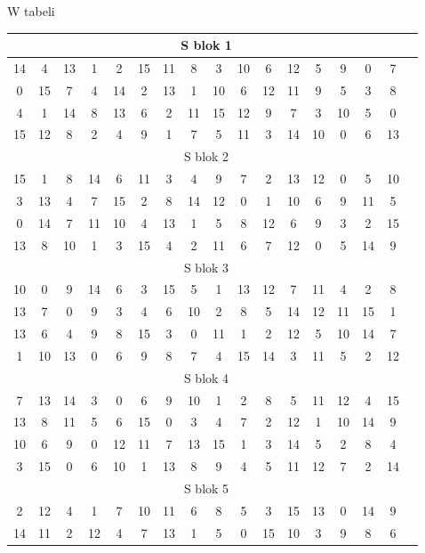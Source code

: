 \documentclass[12p]{article}
\begin{document}
W tabeli
\begin{table}[!h]
\centering
\begin{tabular}{|c|c|c|c|c|c|c|c|c|c|c|c|c|c|c|c|c|}
\hline
\multicolumn{16}{|c|}{S blok 1}\\ 
\hline
14&4&13&1&2&15&11&8&3&10&6&12&5&9&0&7 \\ \hline
0 &	15& 	7 &	4 &	14 &	2& 	13& 	1 &	10 &	6 &	12 &	11 &	9 &	5 &	3 &	8 \\ \hline
4 &	1 &	14 &	8 	&13 	&6 &	2& 	11& 	15& 	12 &	9 	&7& 	3& 	10& 	5& 	0 \\ \hline
15 &	12& 	8 &	2 &	4 &	9 &	1 &	7 &	5 &	11 &	3 &	14 &	10 &	0 &	6 &	13 \\ \hline
\multicolumn{16}{|c|}{S blok 2} \\ \hline
15 &	1 &	8 &	14 &	6 &	11 &	3 &	4 &	9 &	7 &	2 &	13 &	12 &	0 &	5 &	10 \\ \hline
3 &	13& 	4 &	7 &	15 &	2 &	8 &	14 &	12 &	0 &	1 &	10 &	6 &	9 &	11 &	5 \\ \hline
0 &	14 &	7 &	11 &	10 &	4 &	13 &	1 &	5 &	8 &	12 &	6 &	9 &	3 &	2 &	15 \\ \hline
13 &	8 &	10 &	1 &	3 &	15 &	4 &	2 &	11 &	6 &	7 &	12 &	0 &	5 &	14 &	9 \\ \hline
\multicolumn{16}{|c|}{S blok 3}\\ \hline
10 &	0 &	9 &	14 &	6 &	3 &	15 &	5 &	1 &	13 &	12 &	7 &	11 &	4 &	2 &	8\\ \hline
13 &	7 &	0 &	9 &	3 &	4 &	6 &	10 &	2 &	8 &	5 &	14 &	12 &	11 &	15 &	1\\ \hline
13 &	6 &	4 &	9 &	8 &	15 &	3 &	0 &	11 &	1 &	2 &	12 &	5 &	10 &	14 &	7\\ \hline
1 &	10 &	13 &	0 &	6 &	9 &	8 &	7 &	4 &	15 &	14 &	3 &	11 &	5 &	2 &	12 \\ \hline
\multicolumn{16}{|c|}{S blok 4}\\ \hline
7 &	13 &	14 &	3 &	0 &	6 &	9 &	10 &	1 &	2& 	8& 	5& 	11& 	12& 	4& 	15\\ \hline
13& 	8& 	11& 	5& 	6& 	15& 	0& 	3& 	4& 	7& 	2& 	12& 	1& 	10& 	14& 	9\\ \hline
10& 	6& 	9& 	0& 	12& 	11& 	7& 	13& 	15& 	1& 	3& 	14& 	5& 	2& 	8& 	4\\ \hline
3& 	15& 	0& 	6& 	10& 	1& 	13& 	8& 	9& 	4& 	5& 	11& 	12& 	7& 	2& 	14\\ \hline
\multicolumn{16}{|c|}{S blok 5}\\ \hline
2& 	12& 	4& 	1& 	7& 	10& 	11& 	6& 	8& 	5& 	3& 	15& 	13& 	0& 	14& 	9\\ \hline
14& 	11& 	2& 	12& 	4& 	7& 	13& 	1& 	5& 	0& 	15& 	10& 	3& 	9& 	8& 	6\\ \hline

\end{tabular}
\end{table}
\end{document}

